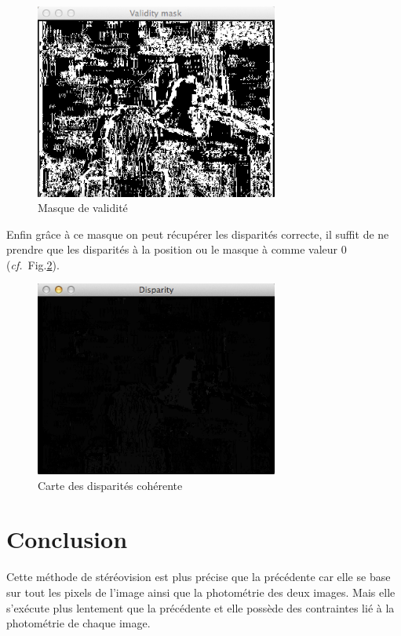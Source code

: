 \documentclass[a4paper,10pt]{article}
\begin{document}
\begin{figure}[ht]
\begin{center}
	\includegraphics[width=8cm]{images/masque.png}
\end{center}
	\caption{Masque de validit\'e}
	\label{masque}
\end{figure}


Enfin gr\^ace \`a ce masque on peut r\'ecup\'erer les disparit\'es correcte, il suffit de ne prendre que les disparit\'es \`a la position ou le masque \`a comme valeur 0 (\emph{cf.}~Fig.\ref{disparite}).

\begin{figure}[ht]
\begin{center}
	\includegraphics[width=8cm]{images/disparite.png}
\end{center}
	\caption{Carte des disparit\'es coh\'erente}
	\label{disparite}
\end{figure}

\section*{Conclusion}

Cette m\'ethode de st\'er\'eovision est plus pr\'ecise que la pr\'ec\'edente car elle se base sur tout les pixels de l'image ainsi que la photom\'etrie des deux images. Mais elle s'ex\'ecute plus lentement que la pr\'ec\'edente et elle poss\`ede des contraintes li\'e \`a la photom\'etrie de chaque image.
\end{document}
